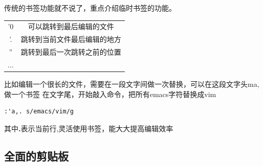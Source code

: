 \documentclass[adobefonts]{ctexart}
\begin{document}
传统的书签功能就不说了，重点介绍临时书签的功能。

\begin{tabular}{c c}
'0  &  可以跳转到最后编辑的文件               \\
'.  &  跳转到当前文件最后编辑的地方           \\
''  &  跳转到最后一次跳转之前的位置           \\
...
\end{tabular}

比如编辑一个很长的文件，需要在一段文字间做一次替换，可以在这段文字头ma,做一个书签
在文字尾，开始敲入命令，把所有emacs字符替换成vim
\begin{verbatim}
:'a,. s/emacs/vim/g 
\end{verbatim}

其中\textbf{.}表示当前行,灵活使用书签，能大大提高编辑效率

\subsection{全面的剪贴板}


\end{document}
